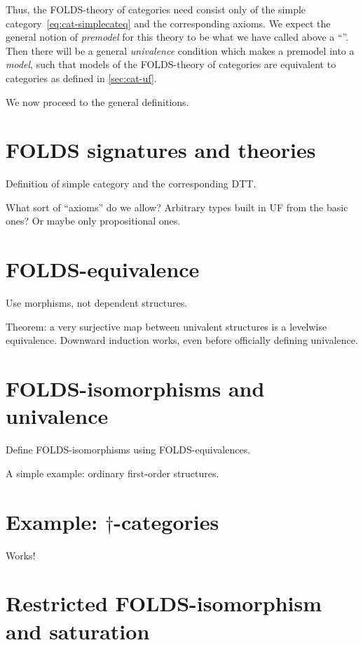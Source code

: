\documentclass{amsart}
\begin{document}
Thus, the FOLDS-theory of categories need consist only of the simple category~\eqref{eq:cat-simplecateq} and the corresponding axioms.
We expect the general notion of \emph{premodel} for this theory to be what we have called above a ``''.
Then there will be a general \emph{univalence} condition which makes a premodel into a \emph{model}, such that models of the FOLDS-theory of categories are equivalent to categories as defined in \autoref{sec:cat-uf}.

We now proceed to the general definitions.


\section{FOLDS signatures and theories}
\label{sec:folds}

Definition of simple category and the corresponding DTT.

What sort of ``axioms'' do we allow?  Arbitrary types built in UF from the basic ones?  Or maybe only propositional ones.


\section{FOLDS-equivalence}
\label{sec:folds-equivalence}

Use morphisms, not dependent structures.

Theorem: a very surjective map between univalent structures is a levelwise equivalence.
Downward induction works, even before officially defining univalence.


\section{FOLDS-isomorphisms and univalence}
\label{sec:folds-isomorphisms}

Define FOLDS-isomorphisms using FOLDS-equivalences.


A simple example: ordinary first-order structures.


\section{Example: $\dagger$-categories}
\label{sec:dagger-categories}

Works!

\section{Restricted FOLDS-isomorphism and saturation}
\label{sec:saturation}
\end{document}
